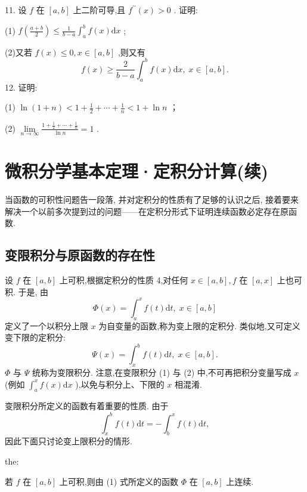 11. 设 \(f\) 在 \(\left\lbrack  {a,b}\right\rbrack\) 上二阶可导,且 \({f}^{\prime \prime }\left( x\right)  > 0\) . 证明:

(1) \(f\left( \frac{a + b}{2}\right)  \leq  \frac{1}{b - a}{\int }_{a}^{b}f\left( x\right) \mathrm{d}x\) ;

(2)又若 \(f\left( x\right)  \leq  0,x \in  \left\lbrack  {a,b}\right\rbrack\) ,则又有
\[
f\left( x\right)  \geq  \frac{2}{b - a}{\int }_{a}^{b}f\left( x\right) \mathrm{d}x,\;x \in  \left\lbrack  {a,b}\right\rbrack  .
\]
12. 证明:

(1) \(\ln \left( {1 + n}\right)  < 1 + \frac{1}{2} + \cdots  + \frac{1}{n} < 1 + \ln n\) ；

(2) \(\mathop{\lim }\limits_{{n \rightarrow  \infty }}\frac{1 + \frac{1}{2} + \cdots  + \frac{1}{n}}{\ln n} = 1\) .

\section{微积分学基本定理·定积分计算(续)}

当函数的可积性问题告一段落, 并对定积分的性质有了足够的认识之后, 接着要来解决一个以前多次提到过的问题——在定积分形式下证明连续函数必定存在原函数.

\subsection{变限积分与原函数的存在性}

设 \(f\) 在 \(\left\lbrack  {a,b}\right\rbrack\) 上可积,根据定积分的性质 4,对任何 \(x \in  \left\lbrack  {a,b}\right\rbrack  ,f\) 在 \(\left\lbrack  {a,x}\right\rbrack\) 上也可积. 于是, 由
\[
\Phi \left( x\right)  = {\int }_{a}^{x}f\left( t\right) \mathrm{d}t,\;x \in  \left\lbrack  {a,b}\right\rbrack   \tag{1}
\]
定义了一个以积分上限 \(x\) 为自变量的函数,称为变上限的定积分. 类似地,又可定义变下限的定积分:
\[
\Psi \left( x\right)  = {\int }_{x}^{b}f\left( t\right) \mathrm{d}t,\;x \in  \left\lbrack  {a,b}\right\rbrack  . \tag{2}
\]
\(\Phi\) 与 \(\Psi\) 统称为变限积分. 注意,在变限积分 (1) 与 (2) 中,不可再把积分变量写成 \(x\) (例如 \({\int }_{a}^{x}f\left( x\right) \mathrm{d}x\) ),以免与积分上、下限的 \(x\) 相混淆.

变限积分所定义的函数有着重要的性质. 由于
\[
{\int }_{x}^{b}f\left( t\right) \mathrm{d}t =  - {\int }_{b}^{x}f\left( t\right) \mathrm{d}t,
\]
因此下面只讨论变上限积分的情形.

\begin{theorem}{}{the:}

\end{theorem}
 若 \(f\) 在 \(\left\lbrack  {a,b}\right\rbrack\) 上可积,则由 (1) 式所定义的函数 \(\Phi\) 在 \(\left\lbrack  {a,b}\right\rbrack\) 上连续.

